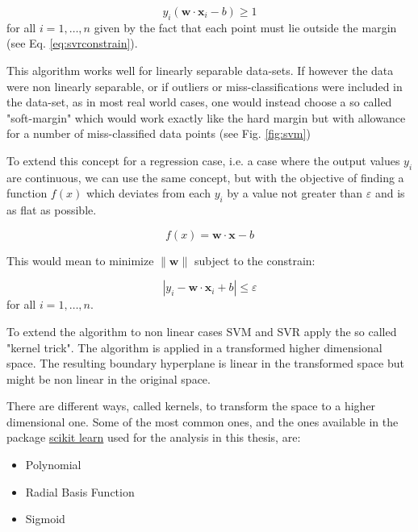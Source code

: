 \begin{equation}\label{eq:svmconstrain}
y_{i}({\mathbf {w}}\cdot {\mathbf {x}}_{i}-b)\geq 1
\end{equation}
for all $i=1,\ldots ,n$ given by the fact that each point must lie outside the margin (see Eq. \ref{eq:svrconstrain}).

This algorithm works well for linearly separable data-sets. If however the data were non linearly separable, or if outliers or miss-classifications were included in the data-set, as in most real  world cases, one would instead choose a so called "soft-margin" which would work exactly like the hard margin but with allowance for a number of miss-classified data points (see Fig. \ref{fig:svm})

To extend this concept for a regression case, i.e. a case where the output values $y_{i}$ are continuous, we can use the same concept, but with the objective of finding a function $f(x)$ which deviates from each $y_{i}$ by a value not greater than $\varepsilon$ and is as flat as possible.

\begin{equation}\label{eq:svr}
f(x) = \mathbf {w}\cdot \mathbf {x}-b
\end{equation}

This would mean to minimize $\|{\mathbf {w}}\|$ subject to the constrain:

\begin{equation}\label{eq:svrconstrain}
|y_{i} - {\mathbf {w}}\cdot {\mathbf {x}}_{i}+b|\leq \varepsilon
\end{equation}
for all $i=1,\ldots ,n$.

To extend the algorithm to non linear cases SVM and SVR apply the so called "kernel trick". The algorithm is applied in a transformed higher dimensional space. The resulting boundary hyperplane is linear in the transformed space but might be non linear in the original space.

There are different ways, called kernels, to transform the space to a higher dimensional one. Some of the most common ones, and the ones available in the package \href{https://scikit-learn.org/}{scikit learn} used for the analysis in this thesis, are:
\begin{itemize}
	\item Polynomial
	\item Radial Basis Function
	\item Sigmoid
\end{itemize} 

